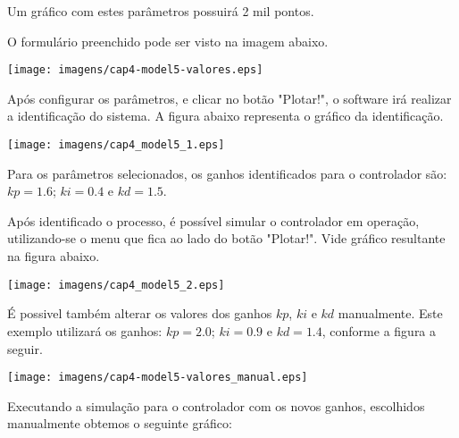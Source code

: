         Um gráfico com estes parâmetros possuirá 2 mil pontos.
        
        O formulário preenchido pode ser visto na imagem abaixo.
        
        \begin{center}
            \texttt{[image: imagens/cap4-model5-valores.eps]}
        \end{center}
        
        Após configurar os parâmetros, e clicar no botão "Plotar!", o software
        irá realizar a identificação do sistema. A figura abaixo representa o
        gráfico da identificação.
        
        \begin{center}
            \texttt{[image: imagens/cap4\_model5\_1.eps]}
        \end{center}
        
        Para os parâmetros selecionados, os ganhos identificados para o
        controlador são: $kp=1.6$; $ki=0.4$ e $kd=1.5$.
        
        Após identificado o processo, é possível simular o controlador em
        operação, utilizando-se o menu que fica ao lado do botão "Plotar!".
        Vide gráfico resultante na figura abaixo.

        \begin{center}
            \texttt{[image: imagens/cap4\_model5\_2.eps]}
        \end{center}
        
        É possivel também alterar os valores dos ganhos $kp$, $ki$ e $kd$ manualmente.
        Este exemplo utilizará os ganhos: $kp=2.0$; $ki=0.9$ e $kd=1.4$,
        conforme a figura a seguir.
        
        \begin{center}
            \texttt{[image: imagens/cap4-model5-valores\_manual.eps]}
        \end{center}
        
        Executando a simulação para o controlador com os novos ganhos, escolhidos manualmente
        obtemos o seguinte gráfico:
        
